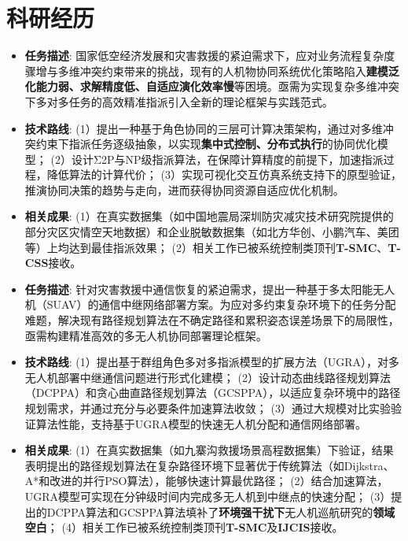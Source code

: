 \documentclass{resume}
\begin{document}
\section{科研经历}
\begin{itemize}[itemsep=0.5ex]
  \item \textbf{任务描述}: 
    国家低空经济发展和灾害救援的紧迫需求下，应对业务流程复杂度骤增与多维冲突约束带来的挑战，现有的人机物协同系统优化策略陷入\textbf{建模泛化能力弱、求解精度低、自适应演化效率慢}等困境。亟需为实现复杂多维冲突下多对多任务的高效精准指派引入全新的理论框架与实践范式。
  \item \textbf{技术路线}: 
    (1）提出一种基于角色协同的三层可计算决策架构，通过对多维冲突约束下指派任务逐级抽象，以实现\textbf{集中式控制、分布式执行}的协同优化模型；
    (2）设计Σ2P与NP级指派算法，在保障计算精度的前提下，加速指派过程，降低算法的计算代价；
    (3）实现可视化交互仿真系统支持下的原型验证，推演协同决策的趋势与走向，进而获得协同资源自适应优化机制。
  \item \textbf{相关成果}: 
    (1）在真实数据集（如中国地震局深圳防灾减灾技术研究院提供的部分灾区灾情空天地数据）和企业脱敏数据集（如北方华创、小鹏汽车、美团等）上均达到最佳指派效果；  
    (2）相关工作已被系统控制类顶刊\textbf{T-SMC}、\textbf{T-CSS}接收。
\end{itemize}

\vspace{1pt}

\begin{itemize}[itemsep=0.5ex]
  \item \textbf{任务描述}: 
    针对灾害救援中通信恢复的紧迫需求，提出一种基于多太阳能无人机（SUAV）的通信中继网络部署方案。为应对多约束复杂环境下的任务分配难题，解决现有路径规划算法在不确定路径和累积姿态误差场景下的局限性，亟需构建精准高效的多无人机协同部署理论框架。
  \item \textbf{技术路线}: 
    (1）提出基于群组角色多对多指派模型的扩展方法（UGRA），对多无人机部署中继通信问题进行形式化建模；
    (2）设计动态曲线路径规划算法（DCPPA）和贪心曲直路径规划算法（GCSPPA），以适应复杂环境中的路径规划需求，并通过充分与必要条件加速算法收敛；
    (3）通过大规模对比实验验证算法性能，支持基于UGRA模型的快速无人机分配和通信网络部署。
  \item \textbf{相关成果}: 
    (1）在真实数据集（如九寨沟救援场景高程数据集）下验证，结果表明提出的路径规划算法在复杂路径环境下显著优于传统算法（如Dijkstra、A*和改进的并行PSO算法），能够快速计算最优路径；
    (2）结合加速算法，UGRA模型可实现在分钟级时间内完成多无人机到中继点的快速分配；
    (3）提出的DCPPA算法和GCSPPA算法填补了\textbf{环境强干扰下}无人机巡航研究的\textbf{领域空白}；
    (4）相关工作已被系统控制类顶刊\textbf{T-SMC}及\textbf{IJCIS}接收。
\end{itemize}
\end{document}
